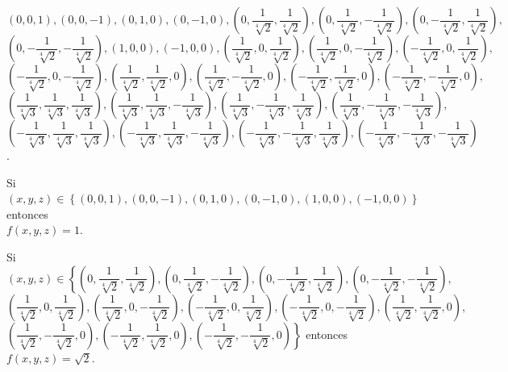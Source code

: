 \documentclass[fleqn, 12pt]{article}
\begin{document}
\begin{list}{\bfseries Ejercicio}{ \addtolength{\itemindent}{-1mm}%
    \addtolength{\labelsep}{-1mm}%
    \addtolength{\leftmargin}{-1cm}%
    \addtolength{\labelwidth}{-1cm} }
\begin{enumerate}[a)]
        $ (0,0,1), (0,0,-1), (0,1,0), (0,-1,0), \left( 0, \dfrac{1}{\sqrt[4]{2}}, \dfrac{1}{\sqrt[4]{2}} \right), \left( 0, \dfrac{1}{\sqrt[4]{2}}, - \dfrac{1}{\sqrt[4]{2}} \right), \left( 0, -\dfrac{1}{\sqrt[4]{2}}, \dfrac{1}{\sqrt[4]{2}} \right), $ \\
        $ \left( 0, -\dfrac{1}{\sqrt[4]{2}}, -\dfrac{1}{\sqrt[4]{2}} \right), (1,0,0), (-1,0,0), \left( \dfrac{1}{\sqrt[4]{2}}, 0, \dfrac{1}{\sqrt[4]{2}} \right), \left( \dfrac{1}{\sqrt[4]{2}}, 0, - \dfrac{1}{\sqrt[4]{2}} \right), \left( - \dfrac{1}{\sqrt[4]{2}}, 0, \dfrac{1}{\sqrt[4]{2}} \right), $ \\
        $ \left( - \dfrac{1}{\sqrt[4]{2}}, 0, - \dfrac{1}{\sqrt[4]{2}} \right), \left( \dfrac{1}{\sqrt[4]{2}}, \dfrac{1}{\sqrt[4]{2}}, 0 \right), \left( \dfrac{1}{\sqrt[4]{2}}, - \dfrac{1}{\sqrt[4]{2}}, 0 \right), \left( - \dfrac{1}{\sqrt[4]{2}}, \dfrac{1}{\sqrt[4]{2}}, 0 \right), \left( - \dfrac{1}{\sqrt[4]{2}}, - \dfrac{1}{\sqrt[4]{2}}, 0 \right), $ \\
        $ \left( \dfrac{1}{\sqrt[4]{3}}, \dfrac{1}{\sqrt[4]{3}}, \dfrac{1}{\sqrt[4]{3}} \right), \left( \dfrac{1}{\sqrt[4]{3}}, \dfrac{1}{\sqrt[4]{3}}, - \dfrac{1}{\sqrt[4]{3}} \right), \left( \dfrac{1}{\sqrt[4]{3}}, - \dfrac{1}{\sqrt[4]{3}}, \dfrac{1}{\sqrt[4]{3}} \right), \left( \dfrac{1}{\sqrt[4]{3}}, - \dfrac{1}{\sqrt[4]{3}}, - \dfrac{1}{\sqrt[4]{3}} \right), $ \\       
        $ \left( - \dfrac{1}{\sqrt[4]{3}}, \dfrac{1}{\sqrt[4]{3}}, \dfrac{1}{\sqrt[4]{3}} \right), \left( - \dfrac{1}{\sqrt[4]{3}}, \dfrac{1}{\sqrt[4]{3}}, - \dfrac{1}{\sqrt[4]{3}} \right), \left( - \dfrac{1}{\sqrt[4]{3}}, - \dfrac{1}{\sqrt[4]{3}}, \dfrac{1}{\sqrt[4]{3}} \right), \left( - \dfrac{1}{\sqrt[4]{3}}, - \dfrac{1}{\sqrt[4]{3}}, - \dfrac{1}{\sqrt[4]{3}} \right) $.

        Si $ (x,y,z) \in \left\lbrace (0,0,1), (0,0,-1), (0,1,0), (0,-1,0), (1,0,0), (-1,0,0) \right\rbrace $ entonces \\ $ f(x,y,z) = 1 $.

        Si $ (x,y,z) \in \left\lbrace \left( 0, \dfrac{1}{\sqrt[4]{2}}, \dfrac{1}{\sqrt[4]{2}} \right), \left( 0, \dfrac{1}{\sqrt[4]{2}}, - \dfrac{1}{\sqrt[4]{2}} \right), \left( 0, -\dfrac{1}{\sqrt[4]{2}}, \dfrac{1}{\sqrt[4]{2}} \right), \left( 0, -\dfrac{1}{\sqrt[4]{2}}, -\dfrac{1}{\sqrt[4]{2}} \right), \right. $ \\
        $ \left( \dfrac{1}{\sqrt[4]{2}}, 0, \dfrac{1}{\sqrt[4]{2}} \right), \left( \dfrac{1}{\sqrt[4]{2}}, 0, - \dfrac{1}{\sqrt[4]{2}} \right), \left( - \dfrac{1}{\sqrt[4]{2}}, 0, \dfrac{1}{\sqrt[4]{2}} \right), \left( - \dfrac{1}{\sqrt[4]{2}}, 0, - \dfrac{1}{\sqrt[4]{2}} \right), \left( \dfrac{1}{\sqrt[4]{2}}, \dfrac{1}{\sqrt[4]{2}}, 0 \right), $ \\   
        $ \left. \left( \dfrac{1}{\sqrt[4]{2}}, - \dfrac{1}{\sqrt[4]{2}}, 0 \right), \left( - \dfrac{1}{\sqrt[4]{2}}, \dfrac{1}{\sqrt[4]{2}}, 0 \right), \left( - \dfrac{1}{\sqrt[4]{2}}, - \dfrac{1}{\sqrt[4]{2}}, 0 \right) \right\rbrace $ entonces $ f(x,y,z) = \sqrt{2} $.


\end{enumerate}
\end{list}
\end{document}
